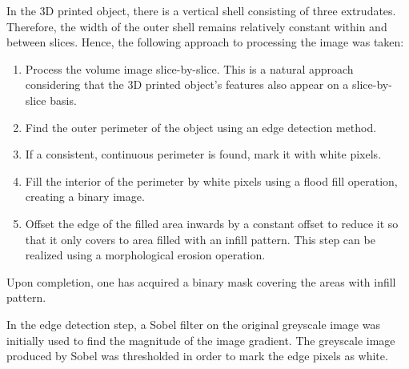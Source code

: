 \documentclass[a4paper,twoside,12pt]{article}
\begin{document}
In the 3D printed object, there is a vertical shell consisting of three extrudates. Therefore, the width of the outer shell remains relatively constant within and between slices. Hence, the following approach to processing the image was taken:
\begin{enumerate}
    \item Process the volume image slice-by-slice. This is a natural approach considering that the 3D printed object's features also appear on a slice-by-slice basis.
    \item Find the outer perimeter of the object using an edge detection method.
    \item If a consistent, continuous perimeter is found, mark it with white pixels.
    \item Fill the interior of the perimeter by white pixels using a flood fill operation, creating a binary image.
    \item \label{step:erosion} Offset the edge of the filled area inwards by a constant offset to reduce it so that it only covers to area filled with an infill pattern. This step can be realized using a morphological erosion operation.
\end{enumerate}
Upon completion, one has acquired a binary mask covering the areas with infill pattern.

In the edge detection step, a Sobel filter on the original greyscale image was initially used to find the magnitude of the image gradient. The greyscale image produced by Sobel was thresholded in order to mark the edge pixels as white.
\end{document}
